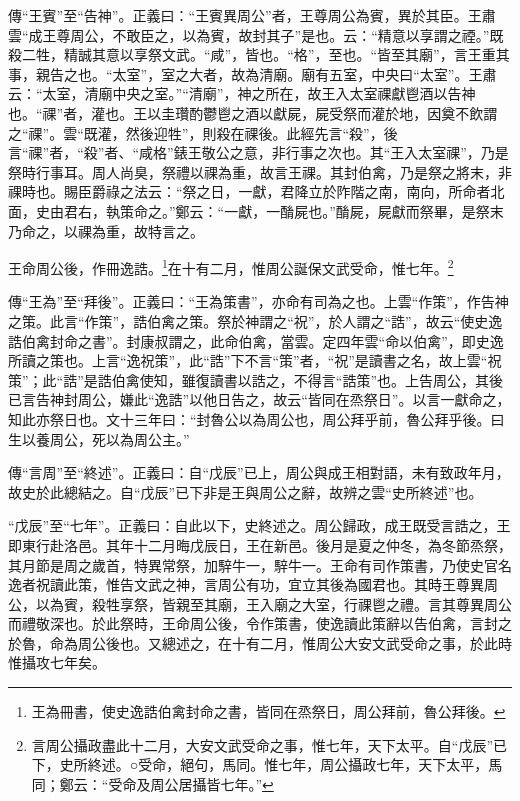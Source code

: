 {\noindent\zhuan{}\fzbyks 傳“王賓”至“告神”。正義曰：“王賓異周公”者，王尊周公為賓，異於其臣。王肅雲“成王尊周公，不敢臣之，以為賓，故封其子”是也。云：“精意以享謂之禋。”既殺二牲，精誠其意以享祭文武。“咸”，皆也。“格”，至也。“皆至其廟”，言王重其事，親告之也。“太室”，室之大者，故為清廟。廟有五室，中央曰“太室”。王肅云：“太室，清廟中央之室。”“清廟”，神之所在，故王入太室祼獻鬯酒以告神也。“祼”者，灌也。王以圭瓚酌鬱鬯之酒以獻屍，屍受祭而灌於地，因奠不飲謂之“祼”。雲“既灌，然後迎牲”，則殺在祼後。此經先言“殺”，後言“祼”者，“殺”者、“咸格”錶王敬公之意，非行事之次也。其“王入太室祼”，乃是祭時行事耳。周人尚臭，祭禮以祼為重，故言王祼。其封伯禽，乃是祭之將末，非祼時也。賜臣爵祿之法云：“祭之日，一獻，君降立於阼階之南，南向，所命者北面，史由君右，執策命之。”鄭云：“一獻，一酳屍也。”酳屍，屍獻而祭畢，是祭末乃命之，以祼為重，故特言之。 \par}

王命周公後，作冊逸誥。\footnote{王為冊書，使史逸誥伯禽封命之書，皆同在烝祭日，周公拜前，魯公拜後。}在十有二月，惟周公誕保文武受命，惟七年。\footnote{言周公攝政盡此十二月，大安文武受命之事，惟七年，天下太平。自“戊辰”已下，史所終述。○受命，絕句，馬同。惟七年，周公攝政七年，天下太平，馬同；鄭云：“受命及周公居攝皆七年。”}

{\noindent\zhuan{}\fzbyks 傳“王為”至“拜後”。正義曰：“王為策書”，亦命有司為之也。上雲“作策”，作告神之策。此言“作策”，誥伯禽之策。祭於神謂之“祝”，於人謂之“誥”，故云“使史逸誥伯禽封命之書”。封康叔謂之，此命伯禽，當雲。定四年雲“命以伯禽”，即史逸所讀之策也。上言“逸祝策”，此“誥”下不言“策”者，“祝”是讀書之名，故上雲“祝策”；此“誥”是誥伯禽使知，雖復讀書以誥之，不得言“誥策”也。上告周公，其後已言告神封周公，嫌此“逸誥”以他日告之，故云“皆同在烝祭日”。以言一獻命之，知此亦祭日也。文十三年曰：“封魯公以為周公也，周公拜乎前，魯公拜乎後。曰生以養周公，死以為周公主。” \par}

{\noindent\zhuan{}\fzbyks 傳“言周”至“終述”。正義曰：自“戊辰”已上，周公與成王相對語，未有致政年月，故史於此總結之。自“戊辰”已下非是王與周公之辭，故辨之雲“史所終述”也。 \par}

{\noindent\shu{}\fzkt “戊辰”至“七年”。正義曰：自此以下，史終述之。周公歸政，成王既受言誥之，王即東行赴洛邑。其年十二月晦戊辰日，王在新邑。後月是夏之仲冬，為冬節烝祭，其月節是周之歲首，特異常祭，加騂牛一，騂牛一。王命有司作策書，乃使史官名逸者祝讀此策，惟告文武之神，言周公有功，宜立其後為國君也。其時王尊異周公，以為賓，殺牲享祭，皆親至其廟，王入廟之大室，行祼鬯之禮。言其尊異周公而禮敬深也。於此祭時，王命周公後，令作策書，使逸讀此策辭以告伯禽，言封之於魯，命為周公後也。又總述之，在十有二月，惟周公大安文武受命之事，於此時惟攝攻七年矣。 \par}

